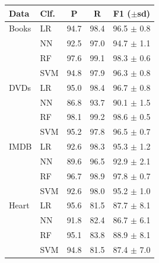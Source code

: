 \begin{tabular}{llccc}
\toprule
Data & Clf. & P & R & F1 ($\pm$sd) \\
\midrule
Books & LR & 94.7 & 98.4 & 96.5 $\pm$ 0.8 \\
 & NN & 92.5 & 97.0 & 94.7 $\pm$ 1.1 \\
 & RF & 97.6 & 99.1 & 98.3 $\pm$ 0.6 \\
 & SVM & 94.8 & 97.9 & 96.3 $\pm$ 0.8 \\
\midrule
DVDs & LR & 95.0 & 98.4 & 96.7 $\pm$ 0.8 \\
 & NN & 86.8 & 93.7 & 90.1 $\pm$ 1.5 \\
 & RF & 98.1 & 99.2 & 98.6 $\pm$ 0.5 \\
 & SVM & 95.2 & 97.8 & 96.5 $\pm$ 0.7 \\
\midrule
IMDB & LR & 92.6 & 98.3 & 95.3 $\pm$ 1.2 \\
 & NN & 89.6 & 96.5 & 92.9 $\pm$ 2.1 \\
 & RF & 96.7 & 98.9 & 97.8 $\pm$ 0.7 \\
 & SVM & 92.6 & 98.0 & 95.2 $\pm$ 1.0 \\
\midrule
Heart & LR & 95.6 & 81.5 & 87.7 $\pm$ 8.1 \\
 & NN & 91.8 & 82.4 & 86.7 $\pm$ 6.1 \\
 & RF & 95.1 & 83.8 & 88.9 $\pm$ 8.1 \\
 & SVM & 94.8 & 81.5 & 87.4 $\pm$ 7.0 \\
\bottomrule
\end{tabular}
